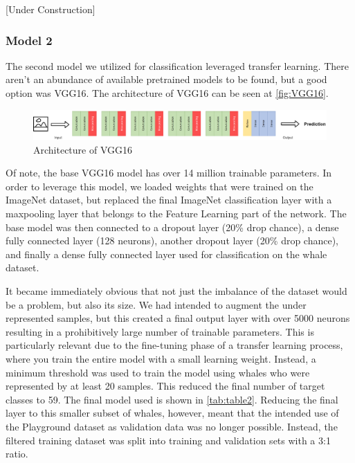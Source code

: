 \documentclass[paper=a4, fontsize=11pt]{scrartcl}
\numberwithin{equation}{section}		%
\numberwithin{table}{section}				%
\begin{document}
[Under Construction]

\subsubsection{Model 2}

The second model we utilized for classification leveraged transfer learning. There aren't an abundance of available pretrained models to be found, but a good option was VGG16. The architecture of VGG16 can be seen at \autoref{fig:VGG16}.

\begin{figure}[h]
    \centering
    \includegraphics[width=1\textwidth]{VGG16.png}
    \caption{Architecture of VGG16}
    \label{fig:VGG16}
\end{figure}

Of note, the base VGG16 model has over 14 million trainable parameters. In order to leverage this model, we loaded weights that were trained on the ImageNet dataset, but replaced the final ImageNet classification layer with a maxpooling layer that belongs to the Feature Learning part of the network. The base model was then connected to a dropout layer (20\% drop chance), a dense fully connected layer (128 neurons), another dropout layer (20\% drop chance), and finally a dense fully connected layer used for classification on the whale dataset. 

It became immediately obvious that not just the imbalance of the dataset would be a problem, but also its size. We had intended to augment the under represented samples, but this created a final output layer with over 5000 neurons resulting in a prohibitively large number of trainable parameters. This is particularly relevant due to the fine-tuning phase of a transfer learning process, where you train the entire model with a small learning weight. Instead, a minimum threshold was used to train the model using whales who were represented by at least 20 samples. This reduced the final number of target classes to 59. The final model used is shown in \autoref{tab:table2}. Reducing the final layer to this smaller subset of whales, however, meant that the intended use of the Playground dataset as validation data was no longer possible. Instead, the filtered training dataset was split into training and validation sets with a 3:1 ratio.
\end{document}
